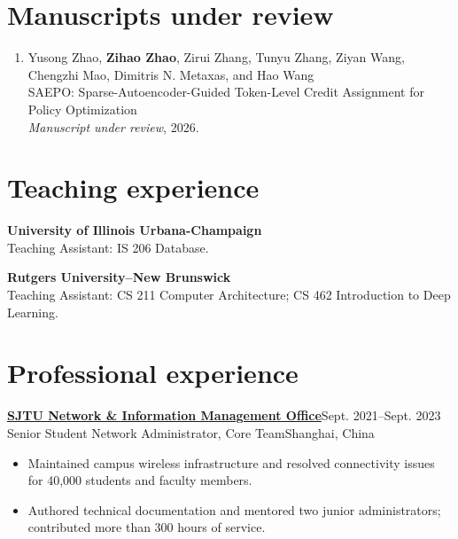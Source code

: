 \documentclass[11pt,letterpaper]{article}
\newcommand{\pub}[3]{\item\begin{minipage}[t]{\linewidth}#1\\#2\\#3\end{minipage}}
\begin{document}
\section{Manuscripts under review}
\begin{enumerate}[resume]
\pub{Yusong Zhao, \textbf{Zihao Zhao}, Zirui Zhang, Tunyu Zhang, Ziyan Wang, Chengzhi Mao, Dimitris N. Metaxas, and Hao Wang}{SAEPO: Sparse-Autoencoder-Guided Token-Level Credit Assignment for Policy Optimization}{\emph{Manuscript under review}, 2026.}
\end{enumerate}
\section{Teaching experience}
\textbf{University of Illinois Urbana-Champaign}\\
Teaching Assistant: IS 206 Database.\par\vspace{4pt}
\textbf{Rutgers University--New Brunswick}\\
Teaching Assistant: CS 211 Computer Architecture; CS 462 Introduction to Deep Learning.
\section{Professional experience}
\textbf{\href{https://nimo.sjtu.edu.cn}{SJTU Network \& Information Management Office}}\hfill Sept. 2021--Sept. 2023\\
Senior Student Network Administrator, Core Team\hfill Shanghai, China
\begin{itemize}
\item Maintained campus wireless infrastructure and resolved connectivity issues for 40,000 students and faculty members.
\item Authored technical documentation and mentored two junior administrators; contributed more than 300 hours of service.
\end{itemize}
\end{document}
